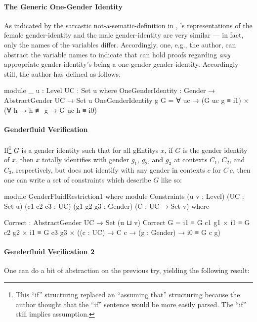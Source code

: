 \documentclass{article}
\theoremstyle{remark}
\begin{document}
\paragraph{The Generic One-Gender Identity}
As indicated by the sarcastic not-a-sematic-definition in , 's representations of the female gender-identity and the male gender-identity are very similar --- in fact, only the names of the variables differ.  Accordingly, one, e.g., the author, can abstract the variable names to indicate that  can hold proofs regarding \emph{any} appropriate gender-identity's being a one-gender gender-identity.  Accordingly still, the author has defined  as follows:

\begin{code}
    module _ {u : Level} {UC : Set u} where
      OneGenderIdentity : Gender → AbstractGender UC → Set u
      OneGenderIdentity g G =
        ∀ uc → (G uc g ≡ i1) × (∀ h → h ≢ g → G uc h ≡ i0)
\end{code}

\paragraph{Genderfluid Verification}
If\footnote{This ``if'' structuring replaced an ``assuming that'' structuring because the author thought that the ``if'' sentence would be more easily parsed.  The ``if'' still implies assumption.} \(G\) is a gender identity such that for all \glspl{gEntity} \(x\), if \(G\) is the gender identity of \(x\), then \(x\) totally identifies with gender \(g_1\), \(g_2\), and \(g_3\) at contexts \(C_1\), \(C_2\), and \(C_3\), respectively, but does not identify with any gender in contexts \(c\) for \(C\ c\), then one can write a set of constraints which describe \(G\) like so:

\begin{code}
    module GenderFluidRestriction1 where
      module Constraints
             (u v : Level)
             (UC : Set u)
             (c1 c2 c3 : UC)
             (g1 g2 g3 : Gender)
             (C : UC → Set v) where

        Correct : AbstractGender UC → Set (u ⊔ v)
        Correct G = i1 ≡ G c1 g1
                  × i1 ≡ G c2 g2
                  × i1 ≡ G c3 g3
                  × ((c : UC) → C c → (g : Gender) → i0 ≡ G c g)
\end{code}

\paragraph{Genderfluid Verification 2}
One can do a bit of abstraction on the previous try, yielding the following result:
\end{document}
